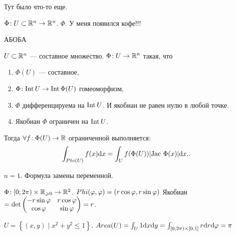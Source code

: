 Тут было что-то еще.
\begin{remark}
    $\Phi\!: U \subset \mathbb{R}^n \to \mathbb{R}^n$.  $\Phi$. У меня появился кофе!!!
\end{remark}
АБОБА
\begin{theorem}
    $U \subset \mathbb{R}^n$ --- составное множество.  $\Phi\!: U \to \mathbb{R}^n$ такая, что
     \begin{enumerate}
        \item $\Phi(U)$ --- составное,
        \item  $\Phi\!: \operatorname{Int} U \to \operatorname{Int} \Phi(U)$ гомеоморфизм,
        \item  $\Phi$ дифференцируема на  $\operatorname{Int} U$. И якобиан не равен нулю в любой точке.
        \item Якобиан  $\Phi$ ограничен на  $\operatorname{Int} U$.
    \end{enumerate}

    Тогда $\forall f\!:\Phi(U) \to \mathbb{R}$ ограниченной выполняется:
     \[
         \int_{Phi(U)} f(x) \mathrm{d}x = \int_U f(\Phi(U)) |\text{Jac}\ \Phi(x)| \mathrm{d}x.
    .\] 
\end{theorem}
\begin{example}
    $n = 1$. Формула замены переменной.
\end{example}
\begin{example}
    $\Phi\!: [0; 2\pi) \times \mathbb{R}_{\geqslant 0} \to \mathbb{R}^2$. $Phi(\varphi, \varphi) = (r  \cos \varphi, r  \sin \varphi)$
    Якобиан $= \det \begin{pmatrix} -r  \sin \varphi & r  \cos \varphi \\ \cos \varphi & \sin \varphi \end{pmatrix} = r$.

    $U = \left\{ (x, y) \mid x^2 + y^2 \le  1 \right\}$. $Area(U) = \int_U 1\mathrm{d}x\mathrm{d}y = \int_{[0, 2\pi) \times [0, 1]} r \mathrm{d}r \mathrm{d}\varphi = \pi$
\end{example}

